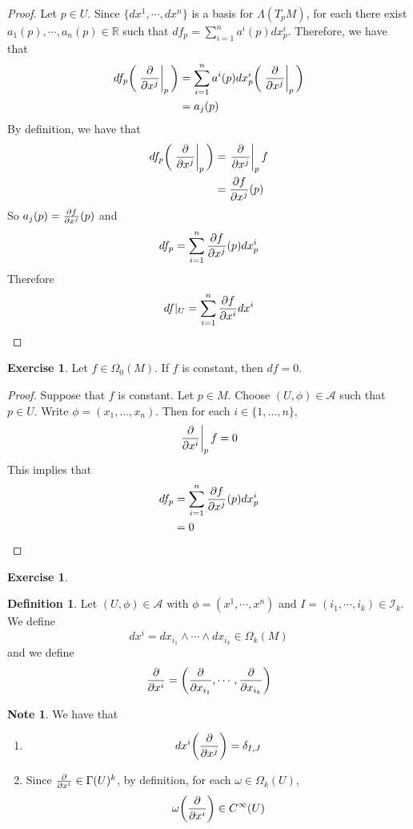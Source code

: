 \documentclass[12pt]{amsart}
\theoremstyle{definition}
\newtheorem{defn}[definition]{Definition}
\newtheorem{note}[definition]{Note}
\newtheorem{ex}[definition]{Exercise}
\newcommand{\Gam}{\Gamma}
\newcommand{\del}{\delta}
\newcommand{\Lam}{\Lambda}
\newcommand{\om}{\omega}
\newcommand{\Om}{\Omega}
\newcommand{\R}{\mathbb{R}}
\newcommand{\MA}{\mathcal{A}}
\newcommand{\MI}{\mathcal{I}}
\begin{document}
	\begin{proof}
		Let $p \in U$. Since $\{dx^1, \cdots, dx^n\}$ is a basis for $\Lam(T_pM)$, for each there exist $a_1(p), \cdots, a_n(p) \in \R$ such that $df_p = \sum\limits_{i=1}^n a^i(p)dx^i_p$. Therefore, we have that 
		\begin{align*}
			df_p \bigg(\eval{\pdv{x^j}}_{p} \bigg) 
			&= \sum\limits_{i=1}^n a^i(p)dx^i_p \bigg(\eval{\pdv{x^j}}_{p} \bigg)  \\
			&=  a_j(p)
		\end{align*}
		By definition, we have that 
		\begin{align*}
			df_p\bigg(\eval{\pdv{x^j}}_{p} \bigg) 
			&= \eval{\pdv{x^j}}_{p} f \\ 
			&= {\pdv{f}{x^j}}(p)\\
		\end{align*}
		So $a_j(p) = {\pdv{f}{x^j}}(p)$ and $$df_p = \sum\limits_{i=1}^n {\pdv{f}{x^j}}(p)dx^i_p$$
		Therefore $$df|_U = \sum\limits_{i=1}^n {\pdv{f}{x^i}}dx^i$$
	\end{proof}
	
	\begin{ex}
	Let $f \in \Om_0(M)$. If $f$ is constant, then $df = 0$. 
	\end{ex}
	
	\begin{proof}
	Suppose that $f$ is constant. Let $p \in M$. Choose $(U, \phi) \in \MA$ such that $p \in U$. Write $\phi = (x_1, \dots, x_n)$. Then for each $i \in \{1, \dots, n\}$, $$\eval{\pdv{x^i}}_p f = 0$$ This implies that 
	\begin{align*}
	df_p 
	&= \sum\limits_{i=1}^n {\pdv{f}{x^j}}(p)dx^i_p \\
	&= 0
	\end{align*}
	\end{proof}
	
	\begin{ex}
	
	\end{ex}

	\begin{defn}
		Let $(U, \phi) \in \MA$ with $\phi = (x^1, \cdots, x^n)$ and $I = (i_1, \cdots, i_k) \in \MI_k$. We define $$dx^i = dx_{i_1} \wedge \cdots \wedge dx_{i_k} \in \Om_k(M)$$ 
		and we define $$\pdv{x^i}= \bigg(\pdv{x_{i_1}}, \cdots, \pdv{x_{i_k}} \bigg)$$

	\end{defn}
	
	\begin{note} We have that
	\begin{enumerate}
	\item  $$d x^i \bigg ( \pdv{x^j} \bigg) = \del_{I,J}$$
	\item Since $\pdv{x^i} \in \Gam(U)^k$, by definition, for each $\om \in \Om_k(U)$, $$\om \bigg(\pdv{x^i} \bigg) \in C^{\infty}(U)$$
	\end{enumerate}
	\end{note}
\end{document}

